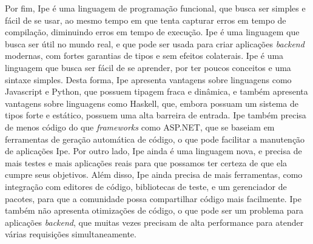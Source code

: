 Por fim, Ipe é uma linguagem de programação funcional, que busca ser simples e fácil de se usar,
ao mesmo tempo em que tenta capturar erros em tempo de compilação, diminuindo erros em tempo de execução.
Ipe é uma linguagem que busca ser útil no mundo real, e que pode ser usada para criar aplicações
\textit{backend} modernas, com fortes garantias de tipos e sem efeitos colaterais. Ipe é uma linguagem
que busca ser fácil de se aprender, por ter poucos conceitos e uma sintaxe simples. Desta forma, Ipe
apresenta vantagens sobre linguagens como Javascript e Python, que possuem tipagem fraca e dinâmica,
e também apresenta vantagens sobre linguagens como Haskell, que, embora possuam um sistema de tipos
forte e estático, possuem uma alta barreira de entrada. Ipe também precisa de menos código do que
\textit{frameworks} como ASP.NET, que se baseiam em ferramentas de geração automática de código, o
que pode facilitar a manutenção de aplicações Ipe. Por outro lado, Ipe ainda é uma linguagem nova,
e precisa de mais testes e mais aplicações reais para que possamos ter certeza de que ela cumpre
seus objetivos. Além disso, Ipe ainda precisa de mais ferramentas, como integração com editores de
código, bibliotecas de teste, e um gerenciador de pacotes, para que a comunidade possa compartilhar
código mais facilmente. Ipe também não apresenta otimizações de código, o que pode ser um problema
para aplicações \textit{backend}, que muitas vezes precisam de alta performance para atender várias
requisições simultaneamente.
